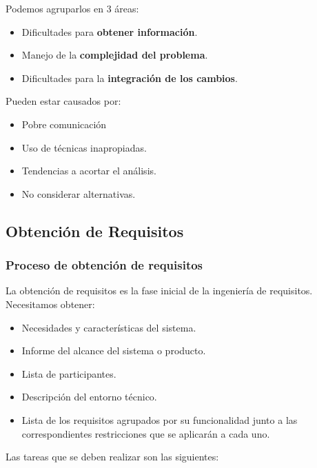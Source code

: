 \documentclass[12pt,spanish]{article}
\begin{document}
Podemos agruparlos en 3 áreas:

\begin{itemize}
	\item Dificultades para \textbf{obtener información}.
	\item Manejo de la \textbf{complejidad del problema}.
	\item Dificultades para la \textbf{integración de los cambios}.
\end{itemize}

Pueden estar causados por:

\begin{itemize}
	\item Pobre comunicación
	\item Uso de técnicas inapropiadas.
	\item Tendencias a acortar el análisis.
	\item No considerar alternativas.
\end{itemize}

\subsection{Obtención de Requisitos}

\subsubsection{Proceso de obtención de requisitos}

La obtención de requisitos es la fase inicial de la ingeniería de requisitos. Necesitamos obtener:
\begin{itemize}
	\item Necesidades y características del sistema.
	\item Informe del alcance del sistema o producto.
	\item Lista de participantes.
	\item Descripción del entorno técnico.
	\item Lista de los requisitos agrupados por su funcionalidad junto a las correspondientes restricciones que se aplicarán a cada uno.
\end{itemize}
\newpage
Las tareas que se deben realizar son las siguientes: 
\end{document}
